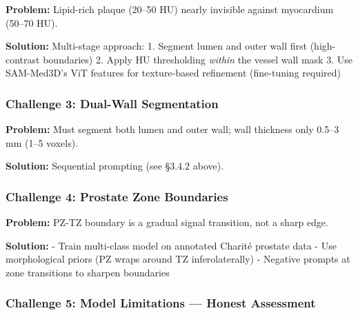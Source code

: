 \documentclass[
  11pt,
]{article}
\begin{document}
\textbf{Problem:} Lipid-rich plaque (20--50 HU) nearly invisible against
myocardium (50--70 HU).

\textbf{Solution:} Multi-stage approach: 1. Segment lumen and outer wall
first (high-contrast boundaries) 2. Apply HU thresholding \emph{within}
the vessel wall mask 3. Use SAM-Med3D's ViT features for texture-based
refinement (fine-tuning required)

\subsubsection{Challenge 3: Dual-Wall
Segmentation}\label{challenge-3-dual-wall-segmentation}

\textbf{Problem:} Must segment both lumen and outer wall; wall thickness
only 0.5--3 mm (1--5 voxels).

\textbf{Solution:} Sequential prompting (see §3.4.2 above).

\subsubsection{Challenge 4: Prostate Zone
Boundaries}\label{challenge-4-prostate-zone-boundaries}

\textbf{Problem:} PZ-TZ boundary is a gradual signal transition, not a
sharp edge.

\textbf{Solution:} - Train multi-class model on annotated Charité
prostate data - Use morphological priors (PZ wraps around TZ
inferolaterally) - Negative prompts at zone transitions to sharpen
boundaries

\subsubsection{Challenge 5: Model Limitations --- Honest
Assessment}\label{challenge-5-model-limitations-honest-assessment}
\end{document}
